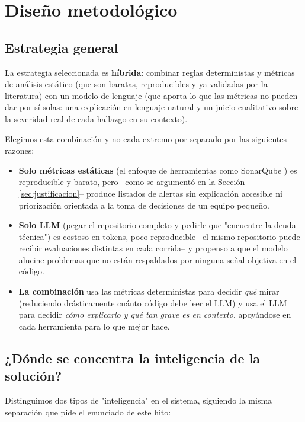 \section{Diseño metodológico}
\label{sec:diseno}

\subsection{Estrategia general}

La estrategia seleccionada es \textbf{híbrida}: combinar reglas deterministas y métricas de análisis estático (que son baratas, reproducibles y ya validadas por la literatura) con un modelo de lenguaje (que aporta lo que las métricas no pueden dar por sí solas: una explicación en lenguaje natural y un juicio cualitativo sobre la severidad real de cada hallazgo en su contexto).

Elegimos esta combinación y no cada extremo por separado por las siguientes razones:

\begin{itemize}
    \item \textbf{Solo métricas estáticas} (el enfoque de herramientas como SonarQube \parencite{SonarQube}) es reproducible y barato, pero --como se argumentó en la Sección \ref{sec:justificacion}-- produce listados de alertas sin explicación accesible ni priorización orientada a la toma de decisiones de un equipo pequeño.
    \item \textbf{Solo LLM} (pegar el repositorio completo y pedirle que "encuentre la deuda técnica") es costoso en tokens, poco reproducible --el mismo repositorio puede recibir evaluaciones distintas en cada corrida-- y propenso a que el modelo alucine problemas que no están respaldados por ninguna señal objetiva en el código.
    \item \textbf{La combinación} usa las métricas deterministas para decidir \emph{qué} mirar (reduciendo drásticamente cuánto código debe leer el LLM) y usa el LLM para decidir \emph{cómo explicarlo y qué tan grave es en contexto}, apoyándose en cada herramienta para lo que mejor hace.
\end{itemize}

\subsection{¿Dónde se concentra la inteligencia de la solución?}

Distinguimos dos tipos de "inteligencia" en el sistema, siguiendo la misma separación que pide el enunciado de este hito:

